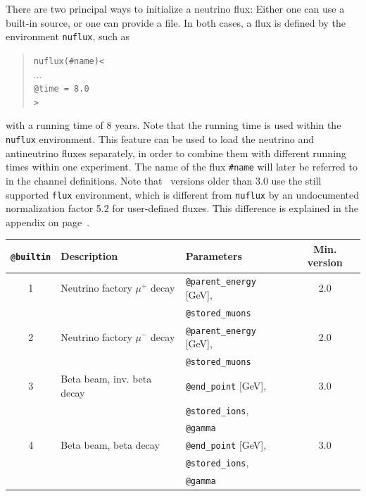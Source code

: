 There are two principal ways to initialize a neutrino flux: 
Either one can use 
a built-in source, or one can provide a file. In both cases,
a flux is defined by the environment {\tt nuflux}, such as
\begin{quote}
  {\tt nuflux(\#name)<\\
\tb $\ldots$\\
\tb @time = 8.0 \\
>}
\end{quote}
with a running time of $8$ years. Note that the running time is used within
the {\tt nuflux} environment. This feature can be used to load the neutrino and antineutrino fluxes separately, in order to combine them with different
running times within one experiment. The name of the flux {\tt \#name} will later be referred to in the channel definitions. Note that \GLOBES\ versions older than 3.0 use the still supported {\tt flux} environment, which is different from {\tt nuflux} by an undocumented normalization factor 5.2 for user-defined fluxes. This difference is explained in the appendix on page~\pageref{app:flux}.


\begin{table}[t]
\begin{center}
\begin{tabular}{|cllc|}
\hline
{\tt @builtin} & Description & Parameters & Min. version \\
\hline
1 & Neutrino factory $\mu^+$ decay & {\tt @parent\_energy} [GeV], & 2.0 \\
& & {\tt @stored\_muons} &  \\
2 & Neutrino factory $\mu^-$ decay & {\tt @parent\_energy} [GeV], & 2.0 \\
& & {\tt @stored\_muons} &  \\
3 & Beta beam, inv. beta decay & {\tt @end\_point} [GeV], & 3.0 \\
& & {\tt @stored\_ions}, &  \\
& & {\tt @gamma} & \\
4 & Beta beam, beta decay & {\tt @end\_point} [GeV], & 3.0 \\
& & {\tt @stored\_ions}, &  \\
& & {\tt @gamma} & \\
\hline
\end{tabular}
\end{center}
\end{table}

